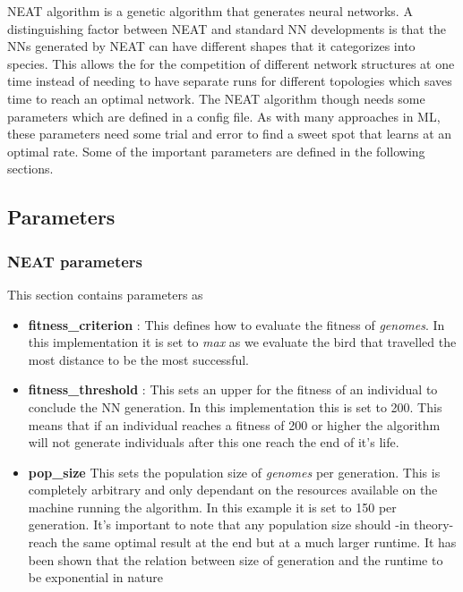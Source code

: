 \documentclass[conference]{IEEEtran}
\begin{document}
NEAT algorithm is a genetic algorithm that generates neural networks. A distinguishing factor between NEAT and standard NN developments is that the NNs generated by NEAT can have different shapes that it categorizes into species. This allows the for the  competition of different network structures at one time instead of needing to have separate runs for different topologies which saves time to reach an optimal network. The NEAT algorithm though needs some parameters which are defined in a config file. As with many approaches in ML, these parameters need some trial and error to find a sweet spot that learns at an optimal rate. Some of the important parameters are defined in the following sections.
\subsection{Parameters}
\subsubsection{NEAT parameters}
This section contains parameters as
\begin{itemize}[]
	\item  \textbf{fitness\_criterion} : This defines how to evaluate the fitness of \textit{genomes}. In this implementation it is set to \textit{max} as we evaluate the bird that travelled the most distance to be the most successful.
	\item \textbf{fitness\_threshold} : This sets an upper for the fitness of an individual to conclude the NN generation. In this implementation this is set to 200. This means that if an individual reaches a fitness of 200 or higher the algorithm will not generate individuals after this one reach the end of it's life.
	\item \textbf{pop\_size} This sets the population size of \textit{genomes} per generation. This is completely arbitrary and only dependant on the resources available on the machine running the algorithm. In this example it is set to 150 per generation. It's important to note that any population size should -in theory- reach the same optimal result at the end but at a much larger runtime. It has been shown that the relation between size of generation and the runtime to be exponential in nature\cite{1299918}

\end{itemize}
\end{document}
